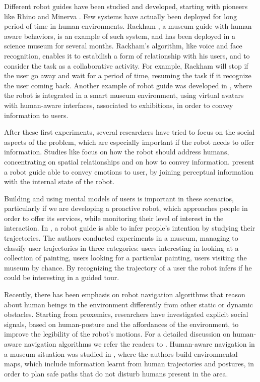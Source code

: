 Different robot guides have been studied and developed, starting with pioneers like Rhino and Minerva \citep{thrun2000probabilistic}.  Few systems have actually been deployed for long period of time in human environments. Rackham \citep{clodic2006rackham}, a museum guide with human-aware behaviors, is an example of such system, and has been deployed in a science museum for several months.  Rackham's algorithm, like voice and face recognition, enables it to estabilish a form of relationship with his users, and to consider the task as a collaborative activity. For example, Rackham will stop if the user go away and wait for a period of time, resuming the task if it recognize the user coming back.
 Another example of robot guide was developed in \cite{bueno2011autonomous}, where the robot is integrated  in a smart museum environment, using virtual avatars with human-aware interfaces, associated to exhibitions, in order to convey information to users. 

 After these first experiments, several researchers have tried to focus on the social aspects of the problem, which are especially important if the robot needs to offer information. Studies like \cite{yousuf2012development,evers2014development} focus on how the robot should address humans, concentrating on spatial relationships and on how to convey information.  \cite{Jensen2005} present a robot guide able to convey emotions to user, by joining perceptual information with the internal state of the robot. 

Building and using mental models of users is important in these scenarios, particularly if we are developing a proactive robot, which approaches people in order to offer its services, while monitoring their level of interest in the interaction.  In \cite{rashed2015toward}, a robot guide is able to infer people's intention by studying their trajectories. The authors conducted experiments in a museum, managing to classify user trajectories in three categories: users interesting in looking at a collection of painting, users looking for a particular painting, users visiting the museum by chance. By recognizing the trajectory of a user the robot infers if he could be interesting in a guided tour.

Recently, there has been emphasis on robot navigation algorithms that reason about human beings in the environment differently from other static or dynamic obstacles. Starting from proxemics, researchers have investigated explicit social signals, based on human-posture and the affordances of the environment, to improve the legibility of the robot's motions. For a detailed discussion on human-aware navigation algorithms we refer the readers to \cite{kruse2013human,rios-ijsr-2014}. Human-aware navigation in a museum situation was studied in \cite{samejima2015building}, where the authors build environmental maps, which include information learnt from human trajectories and postures, in order to plan safe paths that do not disturb humans present in the area. 

